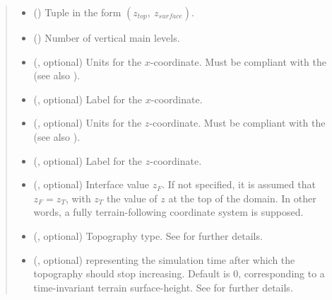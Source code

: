 \documentclass[letterpaper,10pt,english]{sphinxmanual}
\begin{document}
\begin{fulllineitems}
\begin{fulllineitems}
\begin{quote}
\begin{description}
\begin{itemize}
\item {} 
 () \textendash{} Tuple in the form \((z_{top}, ~ z_{surface})\).

\item {} 
 () \textendash{} Number of vertical main levels.

\item {} 
 (, optional) \textendash{} 
Units for the \(x\)-coordinate. Must be compliant with the 
(see also {\hyperref[\detokenize{api:grids.axis.Axis.__init__}]{}}).


\item {} 
 (, optional) \textendash{} Label for the \(x\)-coordinate.

\item {} 
 (, optional) \textendash{} 
Units for the \(z\)-coordinate. Must be compliant with the 
(see also {\hyperref[\detokenize{api:grids.axis.Axis.__init__}]{}}).


\item {} 
 (, optional) \textendash{} Label for the \(z\)-coordinate.

\item {} 
 (, optional) \textendash{} Interface value \(z_F\). If not specified, it is assumed that \(z_F = z_T\), with \(z_T\) the
value of \(z\) at the top of the domain. In other words, a fully terrain-following coordinate system is
supposed.

\item {} 
 (, optional) \textendash{} Topography type. See {\hyperref[\detokenize{api:module-grids.topography}]{}} for further details.

\item {} 
 (, optional) \textendash{}  representing the simulation time after which the topography should stop
increasing. Default is 0, corresponding to a time-invariant terrain surface-height. See
{\hyperref[\detokenize{api:module-grids.topography}]{}} for further details.


\end{itemize}
\end{description}
\end{quote}
\end{fulllineitems}
\end{fulllineitems}
\end{document}
